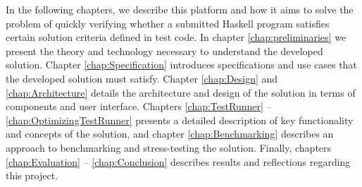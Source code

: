 In the following chapters, we describe this platform and how it aims to solve the problem of quickly verifying whether a submitted Haskell program satisfies certain solution criteria defined in test code.
In chapter \ref{chap:preliminaries} we present the theory and technology necessary to understand the developed solution.
Chapter \ref{chap:Specification} introduces specifications and use cases that the developed solution must satisfy.
Chapter \ref{chap:Design} and \ref{chap:Architecture} details the architecture and design of the solution in terms of components and user interface.
Chapters \ref{chap:TestRunner} -- \ref{chap:OptimizingTestRunner} presents a detailed description of key functionality and concepts of the solution, and chapter \ref{chap:Benchmarking} describes an approach to benchmarking and stress-testing the solution.
Finally, chapters \ref{chap:Evaluation} -- \ref{chap:Conclusion} describes results and reflections regarding this project.


